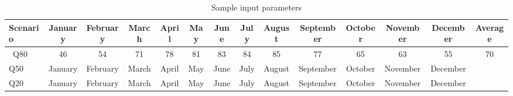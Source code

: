 \begin{table}
\label{tab:Sampleworkability}
\begin{tabular}{lccccccccccccc}
\hline 
Scenario & January & February & March & April  & May & June & July & August & September & October & November & December & Average \\
\hline \
Q80 & 46 & 54 & 71 & 78  & 81 & 83 & 84 & 85 & 77 & 65 & 63 & 55 & 70\\
Q50 & January & February & March & April  & May & June & July & August & September & October & November & December \\
Q20 & January & February & March & April  & May & June & July & August & September & October & November & December \\
\hline 
\end{tabular}
\caption{Sample input parameters }
\end{table}